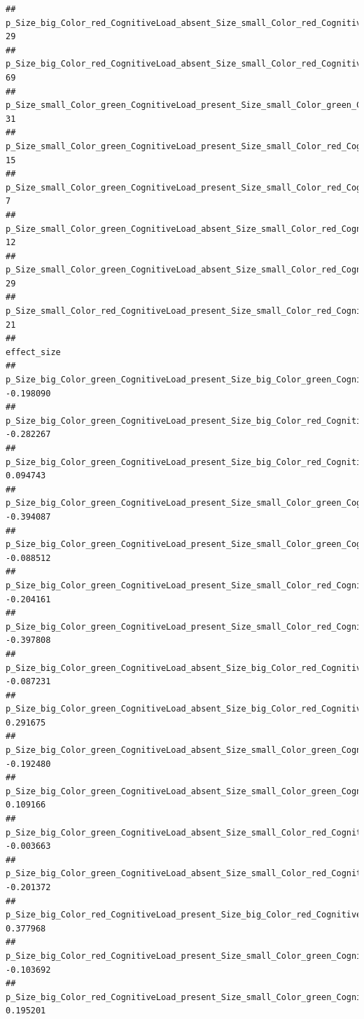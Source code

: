 \documentclass[]{book}
\begin{document}
\begin{verbatim}
## p_Size_big_Color_red_CognitiveLoad_absent_Size_small_Color_red_CognitiveLoad_present          29
## p_Size_big_Color_red_CognitiveLoad_absent_Size_small_Color_red_CognitiveLoad_absent           69
## p_Size_small_Color_green_CognitiveLoad_present_Size_small_Color_green_CognitiveLoad_absent    31
## p_Size_small_Color_green_CognitiveLoad_present_Size_small_Color_red_CognitiveLoad_present     15
## p_Size_small_Color_green_CognitiveLoad_present_Size_small_Color_red_CognitiveLoad_absent       7
## p_Size_small_Color_green_CognitiveLoad_absent_Size_small_Color_red_CognitiveLoad_present      12
## p_Size_small_Color_green_CognitiveLoad_absent_Size_small_Color_red_CognitiveLoad_absent       29
## p_Size_small_Color_red_CognitiveLoad_present_Size_small_Color_red_CognitiveLoad_absent        21
##                                                                                            effect_size
## p_Size_big_Color_green_CognitiveLoad_present_Size_big_Color_green_CognitiveLoad_absent       -0.198090
## p_Size_big_Color_green_CognitiveLoad_present_Size_big_Color_red_CognitiveLoad_present        -0.282267
## p_Size_big_Color_green_CognitiveLoad_present_Size_big_Color_red_CognitiveLoad_absent          0.094743
## p_Size_big_Color_green_CognitiveLoad_present_Size_small_Color_green_CognitiveLoad_present    -0.394087
## p_Size_big_Color_green_CognitiveLoad_present_Size_small_Color_green_CognitiveLoad_absent     -0.088512
## p_Size_big_Color_green_CognitiveLoad_present_Size_small_Color_red_CognitiveLoad_present      -0.204161
## p_Size_big_Color_green_CognitiveLoad_present_Size_small_Color_red_CognitiveLoad_absent       -0.397808
## p_Size_big_Color_green_CognitiveLoad_absent_Size_big_Color_red_CognitiveLoad_present         -0.087231
## p_Size_big_Color_green_CognitiveLoad_absent_Size_big_Color_red_CognitiveLoad_absent           0.291675
## p_Size_big_Color_green_CognitiveLoad_absent_Size_small_Color_green_CognitiveLoad_present     -0.192480
## p_Size_big_Color_green_CognitiveLoad_absent_Size_small_Color_green_CognitiveLoad_absent       0.109166
## p_Size_big_Color_green_CognitiveLoad_absent_Size_small_Color_red_CognitiveLoad_present       -0.003663
## p_Size_big_Color_green_CognitiveLoad_absent_Size_small_Color_red_CognitiveLoad_absent        -0.201372
## p_Size_big_Color_red_CognitiveLoad_present_Size_big_Color_red_CognitiveLoad_absent            0.377968
## p_Size_big_Color_red_CognitiveLoad_present_Size_small_Color_green_CognitiveLoad_present      -0.103692
## p_Size_big_Color_red_CognitiveLoad_present_Size_small_Color_green_CognitiveLoad_absent        0.195201

\end{verbatim}
\end{document}
